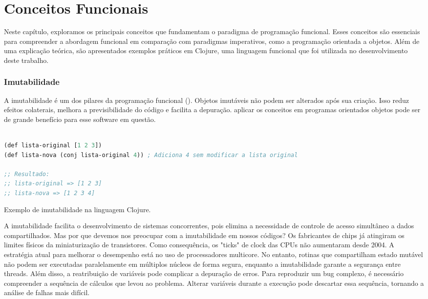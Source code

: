 \chapter{Conceitos Funcionais}

Neste capítulo, exploramos os principais conceitos que fundamentam o paradigma de programação funcional. Esses conceitos são essenciais para compreender a abordagem funcional em comparação com paradigmas imperativos, como a programação orientada a objetos. Além de uma explicação teórica, são apresentados exemplos práticos em Clojure, uma linguagem funcional que foi utilizada no desenvolvimento deste trabalho.


\subsection{Imutabilidade}

A imutabilidade é um dos pilares da programação funcional (). Objetos imutáveis não podem ser alterados após sua criação. Isso reduz efeitos colaterais, melhora a previsibilidade do código e facilita a depuração. aplicar os conceitos em programas orientados objetos pode ser de grande benefício para esse software em questão.

\begin{tcolorbox}[colback=gray!5!white, colframe=gray!75!black, title={Quadro 7 - Imutabilidade}]
\begin{lstlisting}[language=Lisp]

(def lista-original [1 2 3])
(def lista-nova (conj lista-original 4)) ; Adiciona 4 sem modificar a lista original

;; Resultado:
;; lista-original => [1 2 3]
;; lista-nova => [1 2 3 4]

\end{lstlisting}
\caption{Exemplo de imutabilidade na linguagem Clojure.}
\end{tcolorbox}

A imutabilidade facilita o desenvolvimento de sistemas concorrentes, pois elimina a necessidade de controle de acesso simultâneo a dados compartilhados. Mas por que devemos nos preocupar com a imutabilidade em nossos códigos?
Os fabricantes de chips já atingiram os limites físicos da miniaturização de transistores. Como consequência, os "ticks" de clock das CPUs não aumentaram desde 2004. A estratégia atual para melhorar o desempenho está no uso de processadores multicore. No entanto, rotinas que compartilham estado mutável não podem ser executadas paralelamente em múltiplos núcleos de forma segura, enquanto a imutabilidade garante a segurança entre threads.
Além disso, a reatribuição de variáveis pode complicar a depuração de erros. Para reproduzir um bug complexo, é necessário compreender a sequência de cálculos que levou ao problema. Alterar variáveis durante a execução pode descartar essa sequência, tornando a análise de falhas mais difícil.


